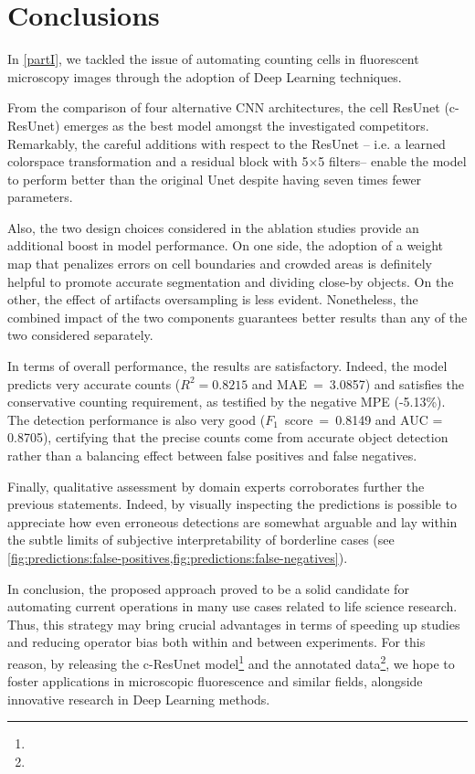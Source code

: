 \chapter{Conclusions}
\label{chap:partI_conclusions}
In \cref{partI}, we tackled the issue of automating counting cells in fluorescent microscopy images through the adoption of Deep Learning techniques.

From the comparison of four alternative CNN architectures, the cell ResUnet (c-ResUnet) emerges as the best model amongst the investigated competitors.
Remarkably, the careful additions with respect to the ResUnet \cite{deep_resunet} -- i.e. a learned colorspace transformation and a residual block with 5$\times$5 filters-- enable the model to perform better than the original Unet \cite{unet} despite having seven times fewer parameters.

Also, the two design choices considered in the ablation studies provide an additional boost in model performance. 
On one side, the adoption of a weight map that penalizes errors on cell boundaries and crowded areas is definitely helpful to promote accurate segmentation and dividing close-by objects. 
On the other, the effect of artifacts oversampling is less evident.
Nonetheless, the combined impact of the two components guarantees better results than any of the two considered separately.

In terms of overall performance, the results are satisfactory. 
Indeed, the model predicts very accurate counts ($R^2 = 0.8215$ and \mbox{MAE = 3.0857}) and satisfies the conservative counting requirement, as testified by the negative MPE (-5.13\%).
The detection performance is also very good (\mbox{$F_1$ score = 0.8149} and AUC = 0.8705), certifying that the precise counts come from accurate object detection rather than a balancing effect between false positives and false negatives.

Finally, qualitative assessment by domain experts corroborates further the previous statements. 
Indeed, by visually inspecting the predictions is possible to appreciate how even erroneous detections are somewhat arguable and lay within the subtle limits of subjective interpretability of borderline cases (see \cref{fig:predictions:false-positives,fig:predictions:false-negatives}).


In conclusion, the proposed approach proved to be a solid candidate for automating current operations in many use cases related to life science research.
Thus, this strategy may bring crucial advantages in terms of speeding up studies and reducing operator bias both within and between experiments.
For this reason, by releasing the c-ResUnet model\footnote{\linkmodel} and the annotated data\footnote{\dataset}, we hope to foster applications in microscopic fluorescence and similar fields, alongside innovative research in Deep Learning methods.